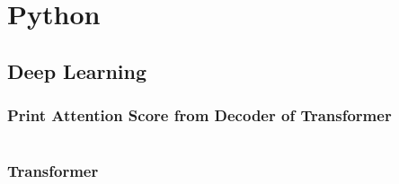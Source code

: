 \chapter{Python}\label{chp:python}
\minitoc

\section{Deep Learning}

\subsection{Print Attention Score from Decoder of Transformer}

\inputminted{python}{code/python/print_prob_from_attention.py}

\subsection{Transformer}
